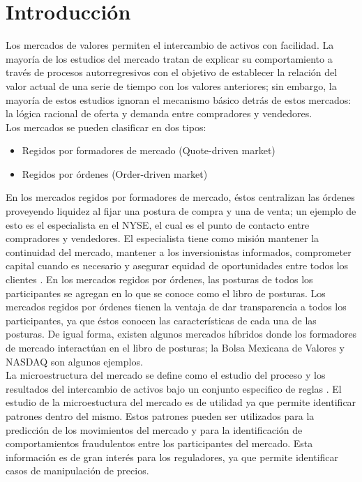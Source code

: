 \documentclass[11pt]{article}
\numberwithin{equation}{section} %
\begin{document}
\thispagestyle{empty}
\tableofcontents
\clearpage

\setcounter{page}{1}

\section{Introducción}

Los mercados de valores permiten el intercambio de activos con facilidad. La mayoría de los estudios del mercado tratan de explicar su comportamiento a través de procesos autorregresivos con el objetivo de establecer la relación del valor actual de una serie de tiempo con los valores anteriores; sin embargo, la mayoría de estos estudios ignoran el mecanismo básico detrás de estos mercados: la lógica racional de oferta y demanda entre compradores y vendedores.\\

Los mercados se pueden clasificar en dos tipos:
\begin{itemize}
  \item Regidos por formadores de mercado (Quote-driven market)
  \item Regidos por órdenes (Order-driven market)
\end{itemize}

En los mercados regidos por formadores de mercado, éstos centralizan las órdenes proveyendo liquidez al fijar una postura de compra y una de venta; un ejemplo de esto es el especialista en el NYSE, el cual es el punto de contacto entre compradores y vendedores. El especialista tiene como misión mantener la continuidad del mercado, mantener a los inversionistas informados, comprometer capital cuando es necesario y asegurar equidad de oportunidades entre todos los clientes \cite{nyse}. En los mercados regidos por órdenes, las posturas de todos los participantes se agregan en lo que se conoce como el libro de posturas. Los mercados regidos por órdenes tienen la ventaja de dar transparencia a todos los participantes, ya que éstos conocen las características de cada una de las posturas. De igual forma, existen algunos mercados híbridos donde los formadores de mercado interactúan en el libro de posturas; la Bolsa Mexicana de Valores y NASDAQ son algunos ejemplos.\\

La microestructura del mercado se define como el estudio del proceso y los resultados del intercambio de activos bajo un conjunto especifico de reglas \cite{1995market}. El estudio de la microestuctura del mercado es de utilidad ya que permite identificar patrones dentro del mismo. Estos patrones pueden ser utilizados para la predicción de los movimientos del mercado y para la identificación de comportamientos fraudulentos entre los participantes del mercado. Esta información es de gran interés para los reguladores, ya que permite identificar casos de manipulación de precios.
\\
\end{document}
